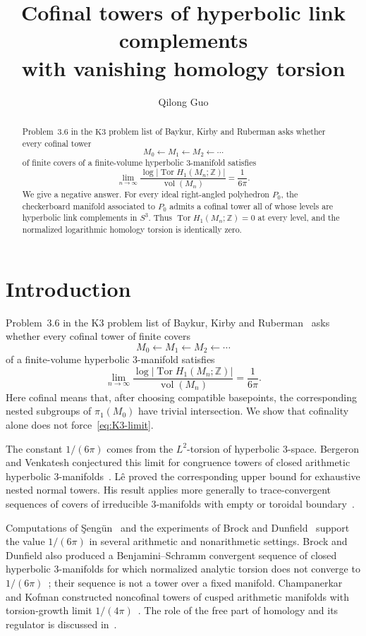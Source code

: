 \documentclass[11pt,a4paper]{amsart}
\title[Cofinal towers with vanishing homology torsion]
{Cofinal towers of hyperbolic link complements\\with vanishing homology torsion}
\author{Qilong Guo}
\newcommand{\ZZ}{\mathbb Z}
\newcommand{\Tor}{\operatorname{Tor}}
\newcommand{\vol}{\operatorname{vol}}
\theoremstyle{plain}
\theoremstyle{remark}
\begin{document}
\begin{abstract}
Problem~3.6 in the $\mathrm{K3}$ problem list of Baykur, Kirby and Ruberman asks whether every cofinal tower
\[
  M_0\longleftarrow M_1\longleftarrow M_2\longleftarrow\cdots
\]
of finite covers of a finite-volume hyperbolic $3$-manifold satisfies
\[
  \lim_{n\to\infty}
  \frac{\log|\Tor H_1(M_n;\ZZ)|}{\vol(M_n)}
  =\frac{1}{6\pi}.
\]
We give a negative answer.  For every ideal right-angled polyhedron $P_0$, the checkerboard manifold associated to $P_0$ admits a cofinal tower all of whose levels are hyperbolic link complements in $S^3$.  Thus $\Tor H_1(M_n;\ZZ)=0$ at every level, and the normalized logarithmic homology torsion is identically zero.
\end{abstract}

\maketitle

\section{Introduction}

Problem~3.6 in the $\mathrm{K3}$ problem list of Baykur, Kirby and Ruberman~\cite{BKR} asks whether every cofinal tower of finite covers
\[
  M_0 \longleftarrow M_1 \longleftarrow M_2 \longleftarrow \cdots
\]
of a finite-volume hyperbolic $3$-manifold satisfies
\begin{equation}\label{eq:K3-limit}
  \lim_{n\to\infty}
  \frac{\log |\Tor H_1(M_n;\ZZ)|}{\vol(M_n)}
  =\frac{1}{6\pi}.
\end{equation}
Here cofinal means that, after choosing compatible basepoints, the corresponding nested subgroups of $\pi_1(M_0)$ have trivial intersection.  We show that cofinality alone does not force~\eqref{eq:K3-limit}.

The constant $1/(6\pi)$ comes from the $L^2$-torsion of hyperbolic $3$-space.  Bergeron and Venkatesh conjectured this limit for congruence towers of closed arithmetic hyperbolic $3$-manifolds~\cite{BV}.  L\^e proved the corresponding upper bound for exhaustive nested normal towers.  His result applies more generally to trace-convergent sequences of covers of irreducible $3$-manifolds with empty or toroidal boundary~\cite{Le}.

Computations of \c{S}eng\"un~\cite{SengunBianchi,SengunTetrahedral} and the experiments of Brock and Dunfield~\cite[Section~4]{BD} support the value $1/(6\pi)$ in several arithmetic and nonarithmetic settings.  Brock and Dunfield also produced a Benjamini--Schramm convergent sequence of closed hyperbolic $3$-manifolds for which normalized analytic torsion does not converge to $1/(6\pi)$~\cite{BD}; their sequence is not a tower over a fixed manifold.  Champanerkar and Kofman constructed noncofinal towers of cusped arithmetic manifolds with torsion-growth limit $1/(4\pi)$~\cite{CK}.  The role of the free part of homology and its regulator is discussed in~\cite{BSV}.
\end{document}
